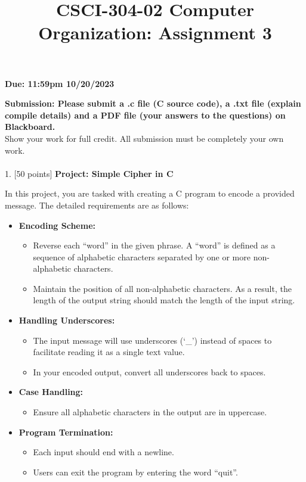 \documentclass[12pt]{extarticle}
\title{CSCI-304-02 Computer Organization: Assignment 3}
\begin{document}
\maketitle


\textbf{Due: 11:59pm 10/20/2023}

\textbf{Submission: Please submit a .c file (C source code), a .txt file (explain compile details) and a PDF file (your answers to the questions) on Blackboard.}\\


Show your work for full credit. All submission must be completely your own work.\\
\\

1. [50 points] \textbf{Project: Simple Cipher in C}

In this project, you are tasked with creating a C program to encode a provided message. The detailed requirements are as follows:

\begin{itemize}
    \item \textbf{Encoding Scheme:}
    \begin{itemize}
        \item Reverse each ``word'' in the given phrase. A ``word'' is defined as a sequence of alphabetic characters separated by one or more non-alphabetic characters.
        \item Maintain the position of all non-alphabetic characters. As a result, the length of the output string should match the length of the input string.
    \end{itemize}
    
    \item \textbf{Handling Underscores:}
    \begin{itemize}
        \item The input message will use underscores (`\_') instead of spaces to facilitate reading it as a single text value.
        \item In your encoded output, convert all underscores back to spaces.
    \end{itemize}
    
    \item \textbf{Case Handling:}
    \begin{itemize}
        \item Ensure all alphabetic characters in the output are in uppercase.
    \end{itemize}
    \item \textbf{Program Termination:}
    \begin{itemize}
        \item Each input should end with a newline.
        \item Users can exit the program by entering the word ``quit''.
    \end{itemize}
\end{itemize}
\end{document}
